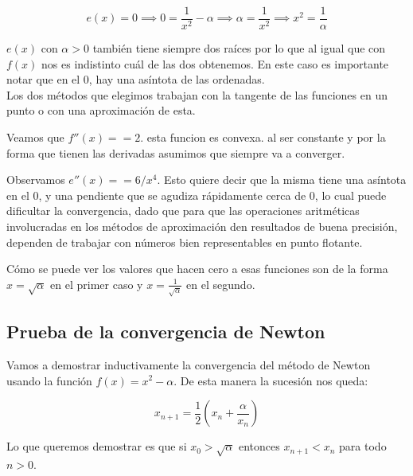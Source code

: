 \begin{displaymath}
    e(x) = 0 \implies 0 = \frac{1}{x^2} - \alpha \implies \alpha = \frac{1}{x^2} \implies x^2 = \frac{1}{\alpha}
\end{displaymath}

$e(x)$ con $\alpha > 0$ también tiene siempre dos raíces por lo que al igual que con
$f(x)$ nos es indistinto cuál de las dos obtenemos. En este caso es importante
notar que en el 0, hay una asíntota de las ordenadas.\\
 
Los dos métodos que elegimos trabajan con la tangente de las funciones en un
punto o con una aproximación de esta.




Veamos que $f''(x) == 2$. esta funcion es convexa. al ser constante y por la
forma que tienen las derivadas asumimos que siempre va a converger.

Observamos $e''(x) == 6/x^4$. Esto quiere decir que la misma tiene una asíntota en el 0,
y una pendiente que se agudiza rápidamente cerca de 0, lo cual puede dificultar la convergencia,
dado que para que las operaciones aritméticas involucradas en los métodos de aproximación 
den resultados de buena precisión, dependen de trabajar con números bien representables en punto flotante.

Cómo se puede ver los valores que hacen cero a esas funciones son de la forma
$x = \sqrt{\alpha}$ en el primer caso y $x = \frac{1}{\sqrt{\alpha}}$ en el
segundo.

\subsection{Prueba de la convergencia de Newton}
Vamos a demostrar inductivamente la convergencia del método de Newton usando la función $\displaystyle f(x) = x^2 - \alpha$. De esta manera la sucesión nos queda:

\begin{displaymath}
    x_{n + 1} = \frac{1}{2}(x_n + \frac{\alpha}{x_n})
\end{displaymath}

Lo que queremos demostrar es que si $x_0 > \sqrt{\alpha}$ entonces $x_{n + 1} < x_n$ para todo $n > 0$.\\

